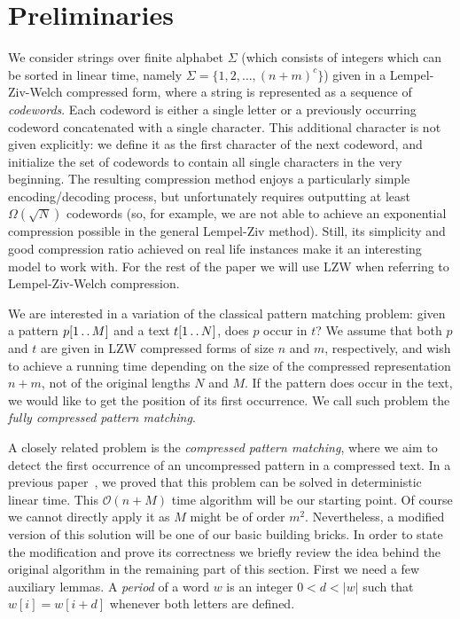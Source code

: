 \documentclass[runningheads]{llncs}
\newcommand{\twodots}{\mathinner{\ldotp\ldotp}}
\begin{document}
\section{Preliminaries}

We consider strings over finite alphabet $\Sigma$ (which consists of integers which can be sorted in linear time, namely $\Sigma=\{1,2,\ldots,(n+m)^c \}$) given in a Lempel-Ziv-Welch compressed form, where a string is represented as a sequence of {\it codewords}. Each codeword is either a single letter or a previously occurring codeword concatenated with a single character. This additional character is not given explicitly: we define it as the first character of the next codeword, and initialize the set of codewords to contain all single characters in the very beginning. The resulting compression method enjoys a particularly simple encoding/decoding process, but unfortunately requires outputting at least $\Omega(\sqrt{N})$ codewords (so, for example, we are not able to achieve an exponential compression possible in the general Lempel-Ziv method). Still, its simplicity and good compression ratio achieved on real life instances make it an interesting model to work with. For the rest of the paper we will use LZW when referring to Lempel-Ziv-Welch compression.

We are interested in a variation of the classical pattern matching problem: given a pattern $p[1\twodots M]$ and a text $t[1\twodots N]$, does $p$ occur in $t$? We assume that both $p$ and $t$ are given in LZW compressed forms of size $n$ and $m$, respectively, and wish to achieve a running time depending on the size of the compressed representation $n+m$, not of the original lengths $N$ and $M$. If the pattern does occur in the text, we would like to get the position of its first occurrence. We call such problem the {\it fully compressed pattern matching}.

A closely related problem is the {\it compressed pattern matching}, where we aim to detect the first occurrence of an uncompressed pattern in a compressed text. In a previous paper~\cite{GawrychowskiLZW}, we proved that this problem can be solved in deterministic linear time. This $\mathcal{O}(n+M)$ time algorithm will be our starting point. Of course we cannot directly apply it as $M$ might be of order $m^2$. Nevertheless, a modified version of this solution will be one of our basic building bricks. In order to state the modification and prove its correctness we briefly review the idea behind the original algorithm in the remaining part of this section. First we need a few auxiliary lemmas. A {\it period} of a word $w$ is an integer $0<d<|w|$ such that $w[i]=w[i+d]$ whenever both letters are defined.
\end{document}
